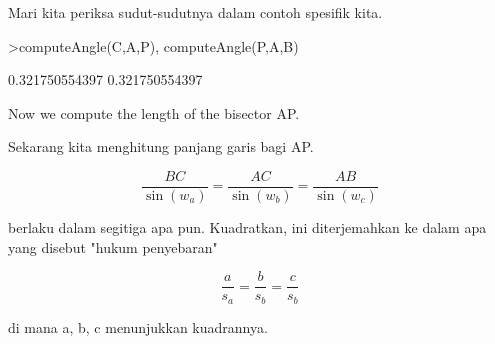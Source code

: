 \documentclass[12pt,Times new roman,letterpaper]{book}
\begin{document}
\begin{eulernootebook}
\begin{eulercomment}
\begin{eulercomment}
\begin{eulernootebook}
\begin{eulercomment}
\begin{eulercomment}
\begin{eulercomment}
\begin{eulercomment}
\begin{eulercomment}
\begin{eulercomment}
\begin{eulernotebook}
\begin{eulercomment}
\begin{eulercomment}
\begin{eulercomment}
\begin{eulercomment}
Mari kita periksa sudut-sudutnya dalam contoh spesifik kita.
\end{eulercomment}
\begin{eulerprompt}
>computeAngle(C,A,P), computeAngle(P,A,B)
\end{eulerprompt}
\begin{euleroutput}
  0.321750554397
  0.321750554397
\end{euleroutput}
\begin{eulercomment}
Now we compute the length of the bisector AP.

Sekarang kita menghitung panjang garis bagi AP.

\end{eulercomment}
\begin{eulerformula}
\[
\frac{BC}{\sin(w_a)} = \frac{AC}{\sin(w_b)} = \frac{AB}{\sin(w_c)}
\]
\end{eulerformula}
\begin{eulercomment}
berlaku dalam segitiga apa pun. Kuadratkan, ini diterjemahkan ke dalam
apa yang disebut "hukum penyebaran"

\end{eulercomment}
\begin{eulerformula}
\[
\frac{a}{s_a} = \frac{b}{s_b} = \frac{c}{s_b}
\]
\end{eulerformula}
\begin{eulercomment}
di mana a, b, c menunjukkan kuadrannya.


\end{eulercomment}
\end{eulercomment}
\end{eulercomment}
\end{eulercomment}
\end{eulernotebook}
\end{eulercomment}
\end{eulercomment}
\end{eulercomment}
\end{eulercomment}
\end{eulercomment}
\end{eulercomment}
\end{eulernootebook}
\end{eulercomment}
\end{eulercomment}
\end{eulernootebook}
\end{document}
